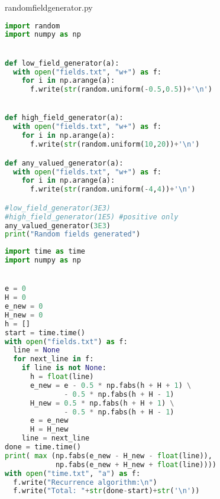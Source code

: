 \newpage
randomfieldgenerator.py
\begin{lstlisting}[language=Python]
import random
import numpy as np


def low_field_generator(a):
  with open("fields.txt", "w+") as f:
    for i in np.arange(a):
      f.write(str(random.uniform(-0.5,0.5))+'\n')


def high_field_generator(a):
  with open("fields.txt", "w+") as f:
    for i in np.arange(a):
      f.write(str(random.uniform(10,20))+'\n')

def any_valued_generator(a):
  with open("fields.txt", "w+") as f:
    for i in np.arange(a):
      f.write(str(random.uniform(-4,4))+'\n')

#low_field_generator(3E3)
#high_field_generator(1E5) #positive only
any_valued_generator(3E3)
print("Random fields generated")
\end{lstlisting}
\newpage
\begin{lstlisting}[language=Python]
import time as time
import numpy as np


e = 0
H = 0
e_new = 0
H_new = 0
h = []
start = time.time()
with open("fields.txt") as f:
  line = None
  for next_line in f:
    if line is not None:
      h = float(line)
      e_new = e - 0.5 * np.fabs(h + H + 1) \
              - 0.5 * np.fabs(h + H - 1)
      H_new = 0.5 * np.fabs(h + H + 1) \
              - 0.5 * np.fabs(h + H - 1)
      e = e_new
      H = H_new
    line = next_line
done = time.time()
print( max (np.fabs(e_new - H_new - float(line)),
            np.fabs(e_new + H_new + float(line))))
with open("time.txt", "a") as f:
  f.write("Recurrence algorithm:\n")
  f.write("Total: "+str(done-start)+str('\n'))
  \end{lstlisting}